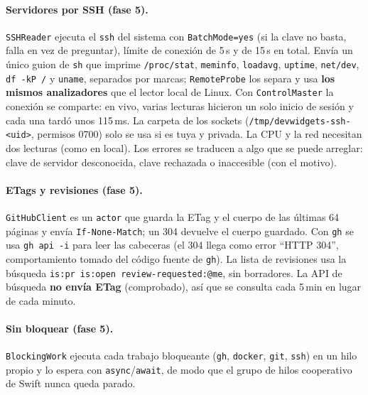 \documentclass[11pt,a4paper]{article}
\begin{document}
\paragraph{Servidores por SSH (fase 5).} \texttt{SSHReader} ejecuta
el \texttt{ssh} del sistema con \texttt{BatchMode=yes} (si la clave
no basta, falla en vez de preguntar), límite de conexión de 5\,s y de
15\,s en total. Envía un único guion de \texttt{sh} que imprime
\texttt{/proc/stat}, \texttt{meminfo}, \texttt{loadavg},
\texttt{uptime}, \texttt{net/dev}, \texttt{df -kP /} y
\texttt{uname}, separados por marcas; \texttt{RemoteProbe} los separa
y usa \textbf{los mismos analizadores} que el lector local de Linux.
Con \texttt{ControlMaster} la conexión se comparte: en vivo, varias
lecturas hicieron un solo inicio de sesión y cada una tardó unos
115\,ms. La carpeta de los sockets (\texttt{/tmp/devwidgets-ssh-<uid>},
permisos 0700) solo se usa si es tuya y privada. La CPU y la red
necesitan dos lecturas (como en local). Los errores se traducen a algo
que se puede arreglar: clave de servidor desconocida, clave rechazada
o inaccesible (con el motivo).

\paragraph{ETags y revisiones (fase 5).} \texttt{GitHubClient} es un
\texttt{actor} que guarda la ETag y el cuerpo de las últimas 64
páginas y envía \texttt{If-None-Match}; un 304 devuelve el cuerpo
guardado. Con \texttt{gh} se usa \texttt{gh api -i} para leer las
cabeceras (el 304 llega como error ``HTTP 304'', comportamiento
tomado del código fuente de \texttt{gh}). La lista de revisiones usa
la búsqueda \texttt{is:pr is:open review-requested:@me}, sin
borradores. La API de búsqueda \textbf{no envía ETag} (comprobado),
así que se consulta cada 5\,min en lugar de cada minuto.

\paragraph{Sin bloquear (fase 5).} \texttt{BlockingWork} ejecuta cada
trabajo bloqueante (\texttt{gh}, \texttt{docker}, \texttt{git},
\texttt{ssh}) en un hilo propio y lo espera con
\texttt{async}/\texttt{await}, de modo que el grupo de hilos
cooperativo de Swift nunca queda parado.
\end{document}
